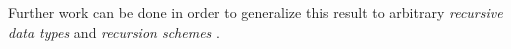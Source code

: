 \documentclass{cys}
\begin{document}
Further work can be done in order to generalize this result to arbitrary \emph{recursive
data types} and \emph{recursion schemes} \cite{meijer1991functional}.

\small{


}
\normalsize

\begin{biography}[]{} %
\end{biography}
\end{document}
